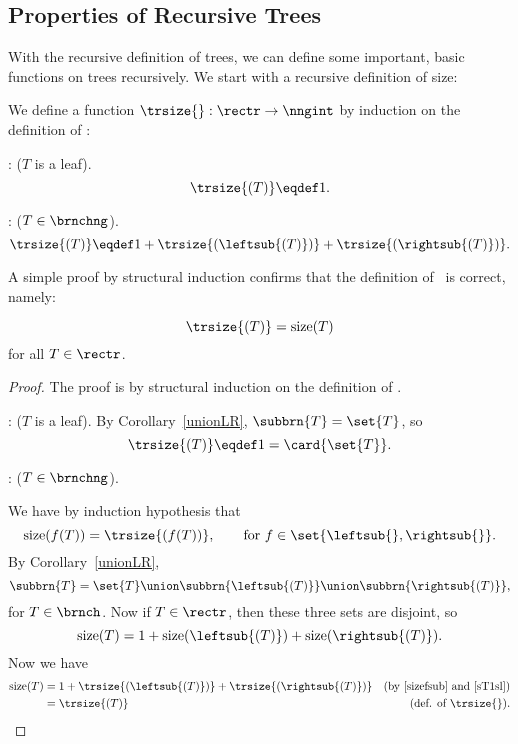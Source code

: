 \begin{definition}
\subsection{Properties of Recursive Trees}
With the recursive definition of trees, we can define some important,
basic functions on trees recursively.  We start with a recursive
definition of size:
\begin{definition}
We define a function $\trsize{}: \rectr \to \nngint$ by induction on
the definition of \rectr:

: ($T$ is a leaf).
\[
\trsize{(T)} \eqdef 1.
\]

: ($T \in \brnchng$).
\[
\trsize{(T)} \eqdef 1 + \trsize{(\leftsub{(T)})} + \trsize{(\rightsub{(T)})}.
\]
\end{definition}

A simple proof by structural induction confirms that the definition of
\trsize{}\ is correct, namely:
\begin{lemma}\label{}
\[
\trsize{(T)} = \text{size}(T)
\]
for all $T \in \rectr$.

\begin{proof}
The proof is by structural induction on the definition of \rectr.

: ($T$ is a leaf).
By Corollary~\ref{unionLR}, $\subbrn{T} = \set{T}$, so
\[
\trsize{(T)} \eqdef 1 = \card{\set{T}}.
\]

: ($T \in\brnchng$).

We have by induction hypothesis that
\begin{equation}\label{sizefsub}
\text{size}(f(T)) = \trsize{(f(T))}, \qquad \text{for}\ f \in
\set{\leftsub{}, \rightsub{}}.
\end{equation}
By Corollary~\ref{unionLR},
\[
\subbrn{T} = \set{T} \union \subbrn{\leftsub{(T)}} \union \subbrn{\rightsub{(T)}},
\]
for $T \in \brnch$.  Now if $T \in \rectr$, then these three sets are disjoint, so
\begin{equation}\label{sT1sl}
\text{size}(T) = 1 + \text{size}(\leftsub{(T)}) + \text{size}(\rightsub{(T)}).
\end{equation}
Now we have
\begin{align*}
\text{size}(T)
 & = 1 + \trsize{(\leftsub{(T)})} + \trsize{(\rightsub{(T)})}
   & \text{(by~\eqref{sizefsub} and~\eqref{sT1sl})}\\
 & = \trsize{(T)} 
   & \text{(def. of \trsize{})}.
\end{align*}
\end{proof}
\end{lemma}


\end{definition}
